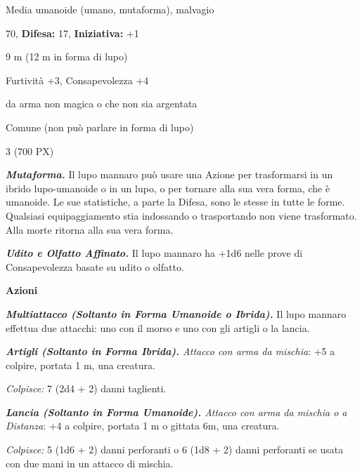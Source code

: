 \begin{multicols}{2}
{
\noindent
\begin{description}[noitemsep, topsep=0pt, parsep=0pt, partopsep=0pt, leftmargin=0cm, labelwidth=2.2cm]
	\item[\textbf{Taglia/Tipo:}] Media umanoide (umano, mutaforma), malvagio
	\item[\textbf{Caratt.:}] 
	\item[\textbf{Punti Ferita:}] 70,  \textbf{Difesa:} 17,  \textbf{Iniziativa:} +1
	\item[\textbf{Movimento:}] 9 m (12 m in forma di lupo)
	\item[\textbf{Tiri Salvez.:}] 
	\item[\textbf{Comp.:}] Furtività +3, Consapevolezza +4
	\item[\textbf{Imm. Danni:}] da arma non magica o che non sia argentata
	\item[\textbf{Linguaggi:}] Comune (non può parlare in forma di lupo)
	\item[\textbf{Sfida:}] 3 (700 PX)\smallskip
\end{description}

\emph{\textbf{Mutaforma.}} Il lupo mannaro può usare una Azione per trasformarsi in un ibrido lupo-umanoide o in un lupo, o per tornare alla sua vera forma, che è umanoide. Le sue statistiche, a parte la Difesa, sono le stesse in tutte le forme. Qualsiasi equipaggiamento stia indossando o trasportando non viene trasformato. Alla morte ritorna alla sua vera forma.

\emph{\textbf{Udito e Olfatto Affinato.}} Il lupo mannaro ha +1d6 nelle prove di Consapevolezza basate su udito o olfatto.

\textbf{Azioni}

\emph{\textbf{Multiattacco (Soltanto in Forma Umanoide o Ibrida).}} Il lupo mannaro effettua due attacchi: uno con il morso e uno con gli artigli o la lancia.

\emph{\textbf{Artigli (Soltanto in Forma Ibrida).} Attacco con arma da mischia}: +5 a colpire, portata 1 m, una creatura.

\emph{Colpisce:} 7 (2d4 + 2) danni taglienti.

\emph{\textbf{Lancia (Soltanto in Forma Umanoide).} Attacco con arma da mischia o a Distanza}: +4 a colpire, portata 1 m o gittata 6m, una creatura.

\emph{Colpisce:} 5 (1d6 + 2) danni perforanti o 6 (1d8 + 2) danni perforanti se usata con due mani in un attacco di mischia.

}
\end{multicols}
